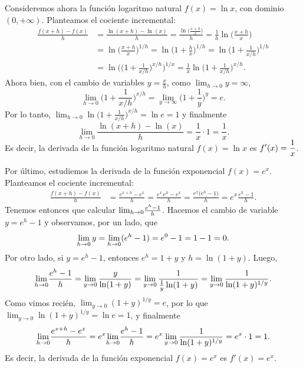 \begin{example}
    Consideremos ahora la función logaritmo natural $f(x)=\ln x$, con dominio $(0,+\infty)$. Planteamos el cociente incremental:
    \begin{align*}
        \frac{f(x+h)-f(x)}{h} 
        &= 
        \frac{\ln(x+h)-\ln(x)}h
        =
        \frac{\ln\big(\frac{x+h}x\big)}h
        =
        \frac1h \ln\big(\frac{x+h}x\big)
        \\
        &= 
        \ln \big(\frac{x+h}x\big)^{1/h}
        = \ln \big(1+\frac{h}{x}\big)^{1/h}
        = \ln \big(1+\frac{1}{x/h}\big)^{1/h}
        \\
        &= \ln\bigg( \big(1+\frac{1}{x/h}\big)^{x/h} \bigg)^{1/x}
        = \frac1x \ln \big(1+\frac{1}{x/h}\big)^{x/h}.
    \end{align*}        
    Ahora bien, con el cambio de variables $y=\frac xh$, como $\lim_{h\to 0}y = \infty$,
    \[
    \lim_{h\to 0} \big(1+\frac{1}{x/h}\big)^{x/h} 
    = \lim_{y\to\infty} \big(1+\frac{1}{y}\big)^{y}
    = e.
    \]
    Por lo tanto, $\lim_{h\to 0} \ln \big(1+\frac{1}{x/h}\big)^{x/h} =\ln e = 1$ y finalmente
    \[
    \lim_{h\to0}  \frac{\ln(x+h)-\ln(x)}h
        = \frac1x \cdot 1 = \frac1x.
    \]
    Es decir, la derivada de la función logaritmo natural $f(x)=\ln x$ es $\displaystyle f'(x)=\frac1x$.
\end{example}

\begin{example}
    Por último, estudiemos la derivada de la función exponencial $f(x)=e^x$.
     Planteamos el cociente incremental:
    \begin{align*}
        \frac{f(x+h)-f(x)}{h} 
        &= \frac{e^{x+h}-e^x}h
        = \frac{e^x \, e^h-e^x}h
        = \frac{e^x \big(e^h-1\big)}h
        = e^x \frac{e^h-1}h.
    \end{align*}
    Tenemos entonces que calcular ${\lim_{h\to 0}} \frac{e^h-1}h$. Hacemos el cambio de variable $y=e^h-1$ y observamos, por un lado, que $${\lim_{h\to 0}}\, y = {\lim_{h\to 0}} (e^h-1) = e^0-1=1-1=0.$$
    Por otro lado, si $y=e^h-1$, entonces $e^h=1+y$ y $h=\ln(1+y)$. Luego,
    \begin{align*}
        {\ensuremath{\lim_{h\to 0}}} \frac{e^h-1}h 
        = \lim_{y\to0} \frac{y}{\ln(1+y)}
        = \lim_{y\to0} \frac{1}{\frac1y\ln(1+y)}
        = \lim_{y\to0} \frac{1}{\ln(1+y)^{1/y}}.
    \end{align*}
    Como vimos recién, $\lim_{y\to 0} (1+y)^{1/y}=e$, por lo que 
    $\lim_{y\to 0} \ln (1+y)^{1/y}=\ln e=1$, y finalmente
    \[
    {\lim_{h\to 0}}  \frac{e^{x+h}-e^x}h
    = e^x {\lim_{h\to 0}} \frac{e^h-1}h 
    = e^x \lim_{y\to0} \frac{1}{\ln(1+y)^{1/y}}
    = e^x \cdot 1 = 1.
    \]
    Es decir, la derivada de la función exponencial $f(x)=e^x$ es $f'(x)=e^x$.
\end{example}

